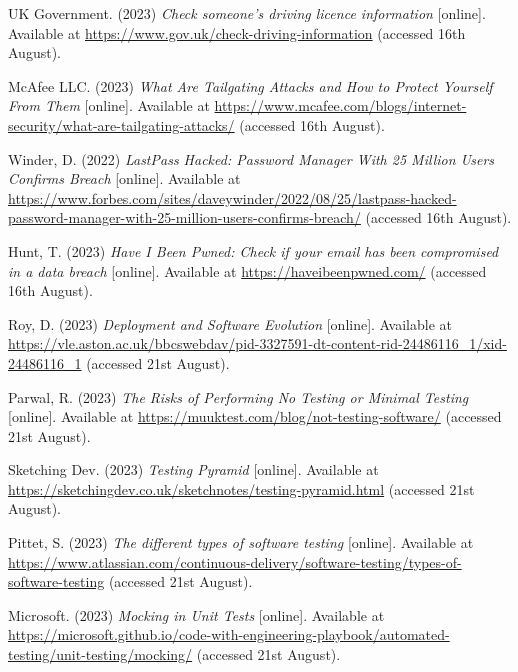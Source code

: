  \noindent [45] UK Government. (2023) \textit{Check someone's driving licence information} [online]. Available at \url{https://www.gov.uk/check-driving-information} (accessed 16th August).
 \vspace{0.2cm}

 \noindent [46] McAfee LLC. (2023) \textit{What Are Tailgating Attacks and How to Protect Yourself From Them} [online]. Available at \url{https://www.mcafee.com/blogs/internet-security/what-are-tailgating-attacks/} (accessed 16th August).
 \vspace{0.2cm}

 \noindent [47] Winder, D. (2022) \textit{LastPass Hacked: Password Manager With 25 Million Users Confirms Breach} [online]. Available at \url{https://www.forbes.com/sites/daveywinder/2022/08/25/lastpass-hacked-password-manager-with-25-million-users-confirms-breach/} (accessed 16th August).
 \vspace{0.2cm}

 \noindent [48] Hunt, T. (2023) \textit{Have I Been Pwned: Check if your email has been compromised in a data breach} [online]. Available at \url{https://haveibeenpwned.com/} (accessed 16th August).
 \vspace{0.2cm}

 \noindent [TODO1] Roy, D. (2023) \textit{Deployment and Software Evolution} [online]. Available at \url{https://vle.aston.ac.uk/bbcswebdav/pid-3327591-dt-content-rid-24486116_1/xid-24486116_1} (accessed 21st August).
 \vspace{0.2cm}

 \noindent [TODO2] Parwal, R. (2023) \textit{The Risks of Performing No Testing or Minimal Testing} [online]. Available at \url{https://muuktest.com/blog/not-testing-software/} (accessed 21st August).
 \vspace{0.2cm}

 \noindent [TODO3] Sketching Dev. (2023) \textit{Testing Pyramid} [online]. Available at \url{https://sketchingdev.co.uk/sketchnotes/testing-pyramid.html} (accessed 21st August).
 \vspace{0.2cm}

 \noindent [TODO4] Pittet, S. (2023) \textit{The different types of software testing} [online]. Available at \url{https://www.atlassian.com/continuous-delivery/software-testing/types-of-software-testing} (accessed 21st August).
 \vspace{0.2cm}

 \noindent [TODO5] Microsoft. (2023) \textit{Mocking in Unit Tests} [online]. Available at \url{https://microsoft.github.io/code-with-engineering-playbook/automated-testing/unit-testing/mocking/} (accessed 21st August).
 \vspace{0.2cm}

